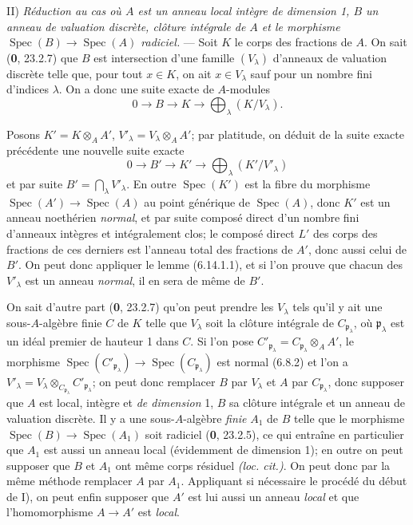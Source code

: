 II) \emph{Réduction au cas où $A$ est un anneau local intègre de dimension
1, $B$ un anneau de valuation discrète, clôture intégrale de $A$ et le
morphisme $\operatorname{Spec}(B)\to\operatorname{Spec}(A)$ radiciel.} ---
Soit $K$ le corps des fractions de $A$. On sait (\textbf{0}, 23.2.7) que $B$ est
intersection d'une famille $(V_\lambda)$ d'anneaux de valuation discrète
telle que, pour tout $x\in K$, on ait $x\in V_\lambda$ sauf pour un nombre
fini d'indices $\lambda$. On a donc une suite exacte de $A$-modules
\[
0\longrightarrow B\longrightarrow K\longrightarrow
\bigoplus_\lambda(K/V_\lambda).
\]

Posons $K'=K\otimes_A A'$, $V'_\lambda=V_\lambda\otimes_A A'$; par
platitude, on déduit de la suite exacte précédente une nouvelle suite
exacte
\[
0\longrightarrow B'\longrightarrow K'\longrightarrow
\bigoplus_\lambda(K'/V'_\lambda)
\]
et par suite $B'=\bigcap_\lambda V'_\lambda$. En outre
$\operatorname{Spec}(K')$ est la fibre du morphisme
$\operatorname{Spec}(A')\to\operatorname{Spec}(A)$ au point générique de
$\operatorname{Spec}(A)$, donc $K'$ est un anneau noethérien \emph{normal}, et par
suite composé direct d'un nombre fini d'anneaux intègres et intégralement
clos; le composé direct $L'$ des corps des fractions de ces derniers est
l'anneau total des fractions de $A'$, donc aussi celui de $B'$. On peut donc
appliquer le lemme (6.14.1.1), et si l'on prouve que chacun des
$V'_\lambda$ est un anneau \emph{normal}, il en sera de même de $B'$.

On sait d'autre part (\textbf{0}, 23.2.7) qu'on peut prendre les $V_\lambda$ tels
qu'il y ait une sous-$A$-algèbre finie $C$ de $K$ telle que $V_\lambda$
soit la clôture intégrale de $C_{\mathfrak p_\lambda}$, où
$\mathfrak p_\lambda$ est un idéal premier de hauteur 1 dans $C$. Si l'on
pose $C'_{\mathfrak p_\lambda}=C_{\mathfrak p_\lambda}\otimes_A A'$, le
morphisme $\operatorname{Spec}(C'_{\mathfrak p_\lambda})\to
\operatorname{Spec}(C_{\mathfrak p_\lambda})$ est normal (6.8.2) et l'on a
$V'_\lambda=V_\lambda\otimes_{C_{\mathfrak p_\lambda}}
C'_{\mathfrak p_\lambda}$; on peut donc remplacer $B$ par $V_\lambda$ et
$A$ par $C_{\mathfrak p_\lambda}$, donc supposer que $A$ est local, intègre
et \emph{de dimension} 1, $B$ sa clôture intégrale et un anneau de valuation
discrète. Il y a une sous-$A$-algèbre \emph{finie} $A_1$ de $B$ telle que le
morphisme $\operatorname{Spec}(B)\to\operatorname{Spec}(A_1)$ soit radiciel
(\textbf{0}, 23.2.5), ce qui entraîne en particulier que $A_1$ est aussi un anneau
local (évidemment de dimension 1); en outre on peut supposer que $B$ et
$A_1$ ont même corps résiduel \emph{(loc. cit.)}. On peut donc par la même méthode
remplacer $A$ par $A_1$. Appliquant si nécessaire le procédé du début de
I), on peut enfin supposer que $A'$ est lui aussi un anneau \emph{local} et que
l'homomorphisme $A\to A'$ est \emph{local}.

